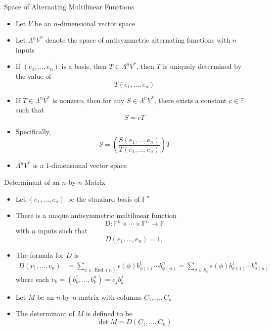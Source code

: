 \documentclass[usenames,dvipsnames,10pt]{beamer}
\newcommand\F{\mathbb{F}}
\newcommand{\End}{\operatorname{End}}
\begin{document}
\begin{frame}
  {Space of Alternating Multilinear Functions}

  \begin{itemize}
  \item Let $V$ be an $n$-dimensional vector space
  \item Let $\Lambda^nV^*$ denote the space of antisymmetric alternating functions with $n$ inputs
  \item If $(e_1, \dots, e_n)$ is a basis, then $T \in \Lambda^nV^*$, then $T$ is uniquely determined by the value of
    \[
      T(e_1, \dots, e_n)
    \]
  \item If $T \in \Lambda^nV^*$ is nonzero, then for any $S \in \Lambda^nV^*$, there exists a constant $c \in \F$ such that
    \[
      S = cT
    \]
  \item Specifically,
    \[
      S = \left(\frac{S(e_1, \dots, e_n)}{T(e_1, \dots, e_n)}\right)T
    \]
  \item $\Lambda^nV^*$ is a $1$-dimensional vector space
  \end{itemize}
\end{frame}

\begin{frame}
  {Determinant of an $n$-by-$n$ Matrix}

  \begin{itemize}
  \item Let $(e_1, \dots, e_n)$ be the standard basis of $\F^n$
  \item There is a unique antisymmetric multilinear function
    \[ D: \F^n \times\cdots \times \F^n \rightarrow \F \]
    with $n$ inputs such that
    \[ D(e_1, \dots, e_n) = 1, \]
  \item The formula for $D$ is
    \begin{align*}
      D(v_1, \dots, v_n) &=\sum_{\phi\in\End(n)} \epsilon(\phi)b^1_{\phi(1)}\cdots b^n_{\phi(n)}
                           = \sum_{\sigma\in S_n} \epsilon(\phi)b^1_{\sigma(1)}\cdots b^n_{\sigma(n)}
    \end{align*}
    where each $v_k = (b_k^1, \dots, b_k^n) = e_jb^j_k$
  \item Let $M$ be an $n$-by-$n$ matrix with columns $C_1, \dots, C_n$
  \item The determinant of $M$ is defined to be
    \[
      \det M = D(C_1, \dots, C_n)
    \]
  \end{itemize}
\end{frame}
\end{document}
